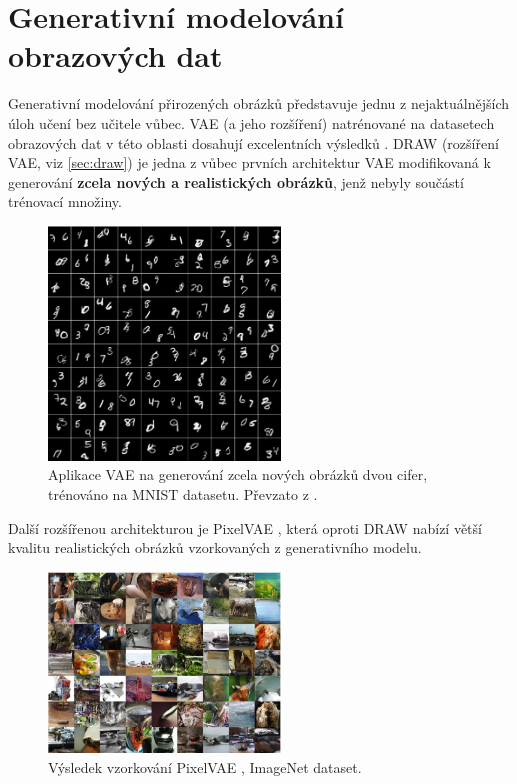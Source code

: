 \section{Generativní modelování obrazových dat}
\label{sec:applications_generative_modeling}
Generativní modelování přirozených obrázků představuje jednu z nejaktuálnějších úloh učení bez učitele vůbec.
VAE (a jeho rozšíření) natrénované na datasetech obrazových dat v této oblasti dosahují excelentních výsledků \cite{Gulrajani2016}.
DRAW (rozšíření VAE, viz \autoref{sec:draw}) je jedna z vůbec prvních architektur VAE modifikovaná k generování \textbf{zcela nových a realistických obrázků}, jenž nebyly součástí trénovací množiny.

\begin{figure}[H]
    \centering
    \includegraphics[width=0.55\textwidth]{figures/applications/mnist_double_digits_gregor.png}
    \caption{Aplikace VAE na generování zcela nových obrázků dvou cifer, trénováno na MNIST datasetu. Převzato z \textcite{Gregor2015}.}
    \label{fig:mnist_double_digits_gregor}
\end{figure}

Další rozšířenou architekturou je PixelVAE \cite{Gulrajani2016}, která oproti DRAW nabízí větší kvalitu realistických obrázků vzorkovaných z generativního modelu.

\begin{figure}[H]
    \centering
    \includegraphics[width=0.55\textwidth]{figures/applications/image_net_pixel_vae_gulrajani.png}
    \caption{Výsledek vzorkování PixelVAE \cite{Gulrajani2016}, ImageNet dataset.}
    \label{fig:image_net_pixel_vae_gulrajani}
\end{figure}

